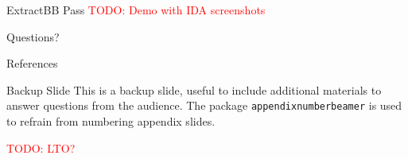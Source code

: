 \documentclass{beamer}
\newcommand{\todo}[1]{\textcolor{red}{TODO: #1}}
\begin{document}
\begin{frame}{ExtractBB Pass}
    \todo{Demo with IDA screenshots}
\end{frame}


\begin{frame}[focus]
    Questions?
\end{frame}


\appendix

\begin{frame}[allowframebreaks]{References}
    \nocite{*} %
    
    
\end{frame}


\begin{frame}{Backup Slide}
    This is a backup slide, useful to include additional materials to answer questions from the audience.
    \vfill
    The package \texttt{appendixnumberbeamer} is used to refrain from numbering appendix slides.

    \todo{LTO?}
\end{frame}

\end{document}
